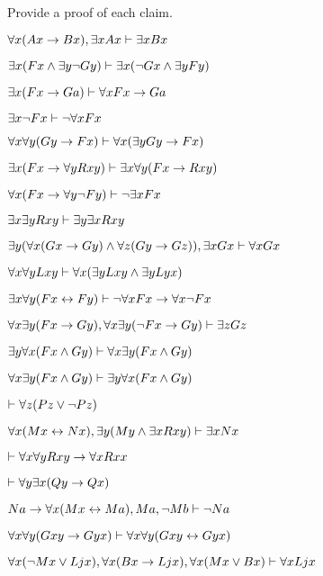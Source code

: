 \problempart
\label{pr.someFOLproofs}
Provide a proof of each claim.
\begin{earg}
\item $\forall x(Ax\rightarrow Bx), \exists x Ax \vdash \exists x Bx$
\item $\exists x(Fx \wedge \exists y\neg Gy) \vdash \exists x(\neg Gx \wedge \exists yFy)$
\item  $\exists x(Fx\rightarrow Ga) \vdash \forall xFx\rightarrow Ga$
\item  $\exists x \neg Fx \vdash \neg \forall xFx$
\item  $\forall x \forall y(Gy \rightarrow Fx) \vdash \forall x(\exists yGy \rightarrow Fx)$
\item $\exists x(Fx \rightarrow \forall yRxy) \vdash \exists x \forall y(Fx \rightarrow Rxy)$
\item $\forall x(Fx\rightarrow \forall y\neg Fy) \vdash \neg \exists xFx$
\item $\exists x\exists yRxy \vdash \exists y \exists xRxy$
\item  $\exists y(\forall x(Gx\rightarrow Gy)\wedge \forall z(Gy\rightarrow Gz)), \exists xGx \vdash \forall xGx$
\item $\forall x\forall yLxy \vdash \forall x(\exists yLxy \wedge \exists yLyx)$
\item $\exists x\forall y (Fx \leftrightarrow Fy) \vdash \neg \forall xFx \rightarrow \forall x\neg Fx$
\item $\forall x \exists y(Fx \rightarrow Gy), \forall x\exists y(\neg Fx \rightarrow Gy) \vdash \exists zGz$
\item $ \exists y\forall x(Fx \wedge Gy) \vdash \forall x \exists y(Fx \wedge Gy)$
\item $\forall x \exists y(Fx \wedge Gy) \vdash \exists y\forall x(Fx \wedge Gy)$
\item $\vdash\forall z (Pz \vee \neg Pz)$
\item $\forall x(Mx \leftrightarrow Nx), \exists y(My\wedge\exists x Rxy)\vdash \exists x Nx$
\item $\vdash\forall x \forall yRxy\rightarrow \forall xRxx$
\item $\vdash\forall y \exists x (Qy \rightarrow Qx)$
\item $Na \rightarrow \forall x(Mx \leftrightarrow Ma), Ma, \neg Mb\vdash \neg Na$
\item $\forall x \forall y (Gxy \rightarrow Gyx) \vdash \forall x\forall y (Gxy \leftrightarrow Gyx)$
\item $\forall x(\neg Mx \vee Ljx), \forall x(Bx\rightarrow Ljx), \forall x(Mx\vee Bx)\vdash \forall xLjx$
\end{earg}


